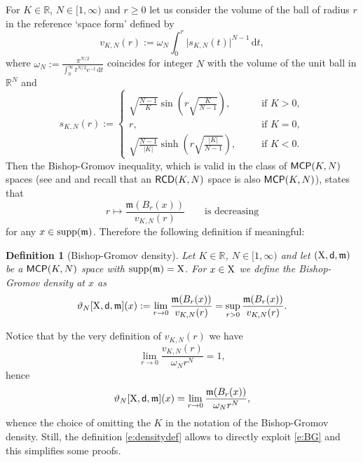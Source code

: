 \documentclass[reqno,11pt]{article}
\numberwithin{equation}{section}
\newcommand{\R}{\mathbb{R}}
\newcommand{\mm}{{\mbox{\boldmath$m$}}}
\newcommand{\sfd}{{\sf d}}
\newcommand{\supp}{\mathop{\rm supp}\nolimits}   %
\renewcommand{\d}{{\mathrm d}}
\renewcommand{\mm}{\mathfrak m}                                %
\newtheorem{definition}[theorem]{Definition}
\newcommand{\X}{{\rm X}}
\newcommand{\MCP}{{\sf MCP}}
\newcommand{\RCD}{{\sf RCD}}
\begin{document}
For $K\in\R$, $N\in[1,\infty)$ and $r\geq 0$ let us consider the volume of the ball of radius $r$ in the reference `space form' defined by
\[
v_{K,N}(r):=\omega_N\int_0^r\big|s_{K,N}(t)\big|^{N-1}\,\d t,
\]
where $\omega_N:=\frac{\pi^{N/2}}{\int_0^\infty t^{N/2}e^{-t} \,\d t}$ coincides for integer \(N\) with the volume of the unit ball in \(\R^N\)  and 
\[
s_{K,N}(r):=
\begin{cases}
\sqrt{\frac{N-1}{K}}\sin(r\sqrt{\frac{K}{N-1}}),\qquad&\text{ if }K>0,\\
r,&\text{ if }K=0,\\
\sqrt{\frac{N-1}{|K|}}\sinh(r\sqrt{\frac{|K|}{N-1}}),&\text{ if }K<0.
\end{cases}
\]
Then the Bishop-Gromov inequality, which is valid in the class of $\MCP(K,N)$ spaces {(see \cite{Ohta07} and \cite{Sturm06II} and recall that an $\RCD(K,N)$ space is also $\MCP(K,N)$)}, states that
\begin{equation}\label{e:BG}
r\mapsto \frac{\mm(B_r(x))}{v_{K,N}(r)}\qquad\text{is decreasing}
\end{equation}
for any $x\in\supp(\mm)$. Therefore the following definition if meaningful:
\begin{definition}[Bishop-Gromov density]\label{def:density} Let $K\in\R$, {$N\in [1,\infty)$} and let $(\X,\sfd,\mm)$ be a $\MCP(K,N)$ space with $\supp(\mm)=\X$. For \(x\in \X\) we define the {\em  Bishop-Gromov density} at \(x\) as 
\begin{equation}\label{e:densitydef}
\vartheta_{N}[\X,\sfd,\mm](x):=\lim_{r \to 0} \frac{\mm(B_r(x))}{v_{K,N}(r)}=\sup_{r >0} \frac{\mm(B_r(x))}{v_{K,N}(r)}.
\end{equation}
\end{definition}
Notice that by the very definition of \(v_{K,N}(r)\) we have
\begin{equation}\label{e:limite}
\lim_{r\to 0} \frac{v_{K,N}(r)}{\omega_N r^N}=1,
\end{equation}
hence
\begin{equation}\label{e:densitysempl}
\vartheta_{N}[\X,\sfd,\mm](x)=\lim_{r \to 0} \frac{\mm(B_r(x))}{\omega_Nr^N},
\end{equation}
whence the choice of omitting the $K$ in the notation of the Bishop-Gromov density. Still,   the definition \eqref{e:densitydef} allows to directly exploit \eqref{e:BG} and this simplifies some proofs.
\end{document}
